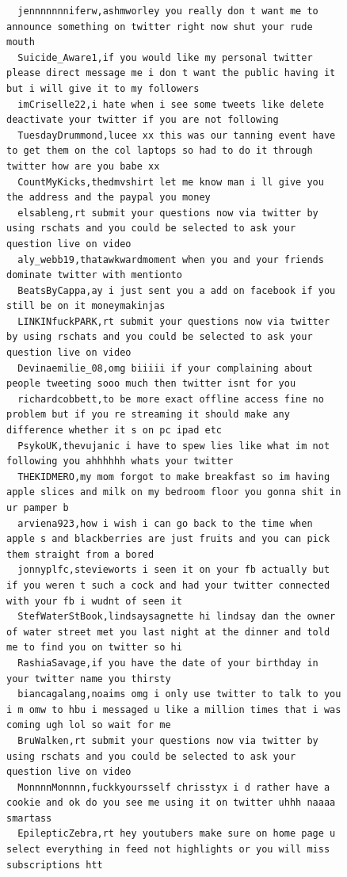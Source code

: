 \begin{figure}[htpb]
\begin{verbatim}
  jennnnnnniferw,ashmworley you really don t want me to announce something on twitter right now shut your rude mouth
  Suicide_Aware1,if you would like my personal twitter please direct message me i don t want the public having it but i will give it to my followers
  imCriselle22,i hate when i see some tweets like delete deactivate your twitter if you are not following
  TuesdayDrummond,lucee xx this was our tanning event have to get them on the col laptops so had to do it through twitter how are you babe xx
  CountMyKicks,thedmvshirt let me know man i ll give you the address and the paypal you money
  elsableng,rt submit your questions now via twitter by using rschats and you could be selected to ask your question live on video
  aly_webb19,thatawkwardmoment when you and your friends dominate twitter with mentionto
  BeatsByCappa,ay i just sent you a add on facebook if you still be on it moneymakinjas
  LINKINfuckPARK,rt submit your questions now via twitter by using rschats and you could be selected to ask your question live on video
  Devinaemilie_08,omg biiiii if your complaining about people tweeting sooo much then twitter isnt for you
  richardcobbett,to be more exact offline access fine no problem but if you re streaming it should make any difference whether it s on pc ipad etc
  PsykoUK,thevujanic i have to spew lies like what im not following you ahhhhhh whats your twitter
  THEKIDMERO,my mom forgot to make breakfast so im having apple slices and milk on my bedroom floor you gonna shit in ur pamper b
  arviena923,how i wish i can go back to the time when apple s and blackberries are just fruits and you can pick them straight from a bored
  jonnyplfc,stevieworts i seen it on your fb actually but if you weren t such a cock and had your twitter connected with your fb i wudnt of seen it
  StefWaterStBook,lindsaysagnette hi lindsay dan the owner of water street met you last night at the dinner and told me to find you on twitter so hi
  RashiaSavage,if you have the date of your birthday in your twitter name you thirsty
  biancagalang,noaims omg i only use twitter to talk to you i m omw to hbu i messaged u like a million times that i was coming ugh lol so wait for me
  BruWalken,rt submit your questions now via twitter by using rschats and you could be selected to ask your question live on video
  MonnnnMonnnn,fuckkyoursself chrisstyx i d rather have a cookie and ok do you see me using it on twitter uhhh naaaa smartass
  EpilepticZebra,rt hey youtubers make sure on home page u select everything in feed not highlights or you will miss subscriptions htt

\end{verbatim}
\end{figure}

